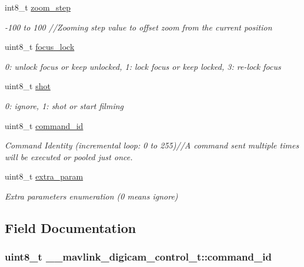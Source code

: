 \begin{DoxyCompactItemize}
int8\+\_\+t \hyperlink{struct____mavlink__digicam__control__t_a348697e63bf346dd8e2d028b2a401dd0}{zoom\+\_\+step}
\begin{DoxyCompactList}\small\item\em -\/100 to 100 //\+Zooming step value to offset zoom from the current position \end{DoxyCompactList}\item 
uint8\+\_\+t \hyperlink{struct____mavlink__digicam__control__t_ace7736fd2e64e2729a128e3e7d7cd407}{focus\+\_\+lock}
\begin{DoxyCompactList}\small\item\em 0\+: unlock focus or keep unlocked, 1\+: lock focus or keep locked, 3\+: re-\/lock focus \end{DoxyCompactList}\item 
uint8\+\_\+t \hyperlink{struct____mavlink__digicam__control__t_ad0b5241aa056e7ead65e22d8837006e7}{shot}
\begin{DoxyCompactList}\small\item\em 0\+: ignore, 1\+: shot or start filming \end{DoxyCompactList}\item 
uint8\+\_\+t \hyperlink{struct____mavlink__digicam__control__t_a67ed21a4baf994d5d61590a7e31aa8dd}{command\+\_\+id}
\begin{DoxyCompactList}\small\item\em Command Identity (incremental loop\+: 0 to 255)//\+A command sent multiple times will be executed or pooled just once. \end{DoxyCompactList}\item 
uint8\+\_\+t \hyperlink{struct____mavlink__digicam__control__t_a2fbbfda72699162be9a4d1eb915a1383}{extra\+\_\+param}
\begin{DoxyCompactList}\small\item\em Extra parameters enumeration (0 means ignore) \end{DoxyCompactList}\end{DoxyCompactItemize}


\subsection{Field Documentation}
\hypertarget{struct____mavlink__digicam__control__t_a67ed21a4baf994d5d61590a7e31aa8dd}{
\subsubsection[{command\+\_\+id}]{\setlength{\rightskip}{0pt plus 5cm}uint8\+\_\+t \+\_\+\+\_\+mavlink\+\_\+digicam\+\_\+control\+\_\+t\+::command\+\_\+id}}\label{struct____mavlink__digicam__control__t_a67ed21a4baf994d5d61590a7e31aa8dd}


